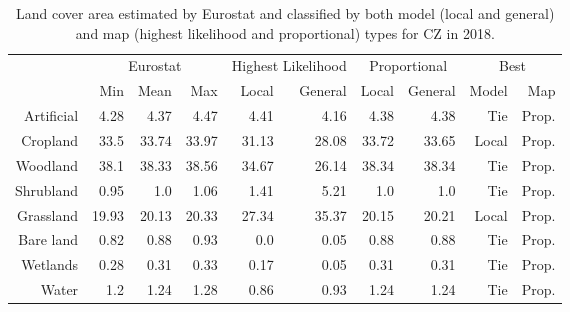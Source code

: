     \begin{table}[H]
    \centering
    \caption{Land cover area estimated by Eurostat and classified by both model (local and general) and map (highest likelihood and proportional) types for CZ in 2018.}
    
    \begin{tabular}{r|rrr|rr|rr|rr}
    \toprule
    {} & \multicolumn{3}{|c}{Eurostat} & \multicolumn{2}{|c}{Highest Likelihood} & \multicolumn{2}{|c}{Proportional} & \multicolumn{2}{|c}{Best} \\
    {} &      Min &   Mean &    Max &              Local & General &        Local & General &  Model &    Map \\
    \midrule
    Artificial &     4.28 &   4.37 &   4.47 &               4.41 &    4.16 &         4.38 &    4.38 &    Tie &  Prop. \\
    Cropland   &     33.5 &  33.74 &  33.97 &              31.13 &   28.08 &        33.72 &   33.65 &  Local &  Prop. \\
    Woodland   &     38.1 &  38.33 &  38.56 &              34.67 &   26.14 &        38.34 &   38.34 &    Tie &  Prop. \\
    Shrubland  &     0.95 &    1.0 &   1.06 &               1.41 &    5.21 &          1.0 &     1.0 &    Tie &  Prop. \\
    Grassland  &    19.93 &  20.13 &  20.33 &              27.34 &   35.37 &        20.15 &   20.21 &  Local &  Prop. \\
    Bare land  &     0.82 &   0.88 &   0.93 &                0.0 &    0.05 &         0.88 &    0.88 &    Tie &  Prop. \\
    Wetlands   &     0.28 &   0.31 &   0.33 &               0.17 &    0.05 &         0.31 &    0.31 &    Tie &  Prop. \\
    Water      &      1.2 &   1.24 &   1.28 &               0.86 &    0.93 &         1.24 &    1.24 &    Tie &  Prop. \\
    \bottomrule
    \end{tabular}
    \end{table}
    
    
